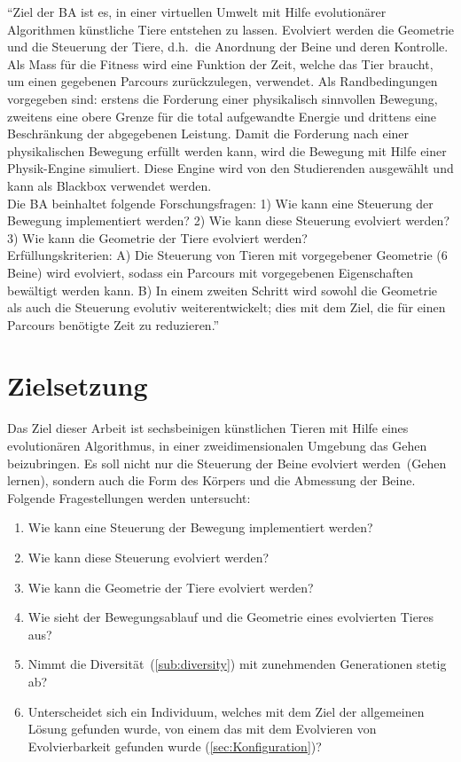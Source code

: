     ``Ziel der BA ist es,
    in einer virtuellen Umwelt mit Hilfe evolutionärer Algorithmen künstliche Tiere entstehen zu lassen.
    Evolviert werden die Geometrie und die Steuerung der Tiere,
    d.h.\ die Anordnung der Beine und deren Kontrolle.
    Als Mass für die Fitness wird eine Funktion der Zeit, welche das Tier braucht,
    um einen gegebenen Parcours zurückzulegen, verwendet.
    Als Randbedingungen vorgegeben sind: erstens die Forderung einer physikalisch sinnvollen Bewegung,
    zweitens eine obere Grenze für die total aufgewandte Energie und drittens eine Beschränkung der abgegebenen Leistung.
    Damit die Forderung nach einer physikalischen Bewegung erfüllt werden kann,
    wird die Bewegung mit Hilfe einer Physik-Engine simuliert.
    Diese Engine wird von den Studierenden ausgewählt und kann als Blackbox verwendet werden.
    \\
    Die BA beinhaltet folgende Forschungsfragen: 1) Wie kann eine Steuerung der Bewegung implementiert werden?
    2) Wie kann diese Steuerung evolviert werden? 3) Wie kann die Geometrie der Tiere evolviert werden?
    \\
    Erfüllungskriterien: A) Die Steuerung von Tieren mit vorgegebener Geometrie (6 Beine) wird evolviert,
    sodass ein Parcours mit vorgegebenen Eigenschaften bewältigt werden kann.
    B) In einem zweiten Schritt wird sowohl die Geometrie als auch die Steuerung evolutiv weiterentwickelt;
    dies mit dem Ziel, die für einen Parcours benötigte Zeit zu reduzieren.''~\cite{Task}

  \section{Zielsetzung}

    Das Ziel dieser Arbeit ist sechsbeinigen künstlichen Tieren mit Hilfe eines evolutionären Algorithmus,
    in einer zweidimensionalen Umgebung das Gehen beizubringen.
    Es soll nicht nur die Steuerung der Beine evolviert werden~(Gehen lernen),
    sondern auch die Form des Körpers und die Abmessung der Beine.
    \\
    Folgende Fragestellungen werden untersucht:

    \begin{enumerate}
      \item Wie kann eine Steuerung der Bewegung implementiert werden?\label{item:frageSteuerungBeine}
      \item Wie kann diese Steuerung evolviert werden?
      \item Wie kann die Geometrie der Tiere evolviert werden?
      \item Wie sieht der Bewegungsablauf und die Geometrie eines evolvierten Tieres aus?
      \item Nimmt die Diversität~(\vref{sub:diversity}) mit zunehmenden Generationen stetig ab?
      \item Unterscheidet sich ein Individuum, welches mit dem Ziel der allgemeinen Lösung gefunden wurde,
            von einem das mit dem Evolvieren von Evolvierbarkeit gefunden wurde (\vref{sec:Konfiguration})?
    \end{enumerate}

